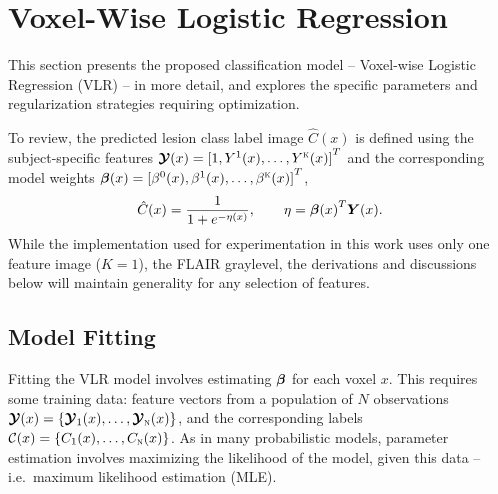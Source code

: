 \chapter{Voxel-Wise Logistic Regression}\label{ch-vlr}
This section presents the proposed classification model
-- Voxel-wise Logistic Regression (VLR) --
in more detail, and explores the specific parameters and regularization strategies
requiring optimization.
\par
To review, the predicted lesion class label image $\hat{C}(x)$ is defined
using the subject-specific features $\bm{\mathcal{Y}}(x) = {[1,Y^1(x),\dots,Y^{\textsc{k}}(x)]}^T$
and the corresponding model weights $\bm{\beta}(x) = {[\beta^0(x),\beta^1(x),\dots,\beta^{\textsc{k}}(x)]}^T$,
\begin{equation}
\hat{C}(x) = \frac{1}{1+e^{-\eta(x)}},\qquad\eta = {\bb(x)}^T\bm{Y}(x).%
\label{eq:eq:vlrmodel}
\end{equation}
While the implementation used for experimentation in this work
uses only one feature image ($K=1$), the FLAIR graylevel,
the derivations and discussions below will maintain generality for any selection of features.
\section{Model Fitting}\label{ss:modelfitting}
Fitting the VLR model involves estimating $\bm{\beta}$ for each voxel $x$.
This requires some training data:
feature vectors from a population of $N$ observations $\bm{\mathcal{Y}}(x) = \{\bm{\mathcal{Y}}_1(x),\dots,\bm{\mathcal{Y}}_{\textsc{n}}(x)\}$,
and the corresponding labels $\mathcal{C}(x) = \{C_1(x),\dots,C_{\textsc{n}}(x)\}$. 
As in many probabilistic models,
parameter estimation involves maximizing the likelihood of the model, given this data --
i.e.\ maximum likelihood estimation (MLE).

